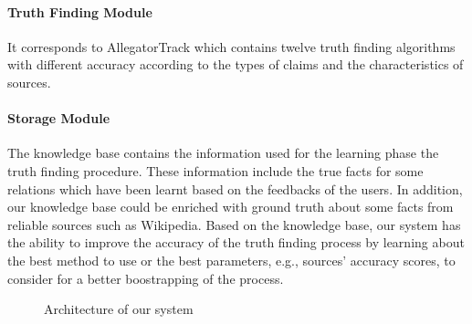 \paragraph*{Truth Finding Module} It corresponds to AllegatorTrack which contains
twelve truth finding algorithms with different accuracy according to the types of 
claims and the characteristics of sources.



\paragraph*{Storage Module}The knowledge base contains the information used for the learning
phase the truth finding procedure. These information include the true facts for some relations
which have been learnt based on the feedbacks of the users. In addition, our knowledge base could
be enriched with ground truth about some facts from reliable sources such as Wikipedia. Based on 
the knowledge base, our system has the ability to improve the accuracy of the truth finding process
by learning about the best method to use or the best parameters, e.g., sources' accuracy scores, to 
consider for a better boostrapping of the process.

\begin{figure}[ht]
\caption{Architecture of our system}\label{system_architecture}
\end{figure}

